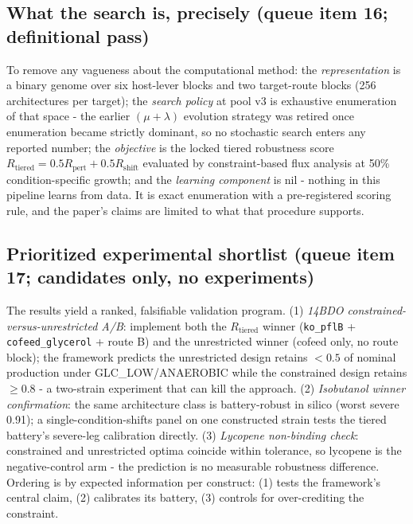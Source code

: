 \documentclass[12pt,a4paper]{article}
\begin{document}
\subsection{What the search is, precisely (queue item 16; definitional pass)}
To remove any vagueness about the computational method: the \emph{representation} is a binary genome over six host-lever blocks and two target-route blocks (256 architectures per target); the \emph{search policy} at pool v3 is exhaustive enumeration of that space - the earlier $(\mu+\lambda)$ evolution strategy was retired once enumeration became strictly dominant, so no stochastic search enters any reported number; the \emph{objective} is the locked tiered robustness score $R_{\mathrm{tiered}} = 0.5 R_{\mathrm{pert}} + 0.5 R_{\mathrm{shift}}$ evaluated by constraint-based flux analysis at 50\% condition-specific growth; and the \emph{learning component} is nil - nothing in this pipeline learns from data. It is exact enumeration with a pre-registered scoring rule, and the paper's claims are limited to what that procedure supports.

\subsection{Prioritized experimental shortlist (queue item 17; candidates only, no experiments)}
The results yield a ranked, falsifiable validation program. (1) \emph{14BDO constrained-versus-unrestricted A/B}: implement both the $R_{\mathrm{tiered}}$ winner (\texttt{ko\_pflB} + \texttt{cofeed\_glycerol} + route B) and the unrestricted winner (cofeed only, no route block); the framework predicts the unrestricted design retains $< 0.5$ of nominal production under GLC\_LOW/ANAEROBIC while the constrained design retains $\ge 0.8$ - a two-strain experiment that can kill the approach. (2) \emph{Isobutanol winner confirmation}: the same architecture class is battery-robust in silico (worst severe 0.91); a single-condition-shifts panel on one constructed strain tests the tiered battery's severe-leg calibration directly. (3) \emph{Lycopene non-binding check}: constrained and unrestricted optima coincide within tolerance, so lycopene is the negative-control arm - the prediction is no measurable robustness difference. Ordering is by expected information per construct: (1) tests the framework's central claim, (2) calibrates its battery, (3) controls for over-crediting the constraint.
\end{document}
